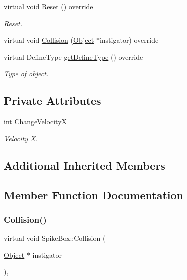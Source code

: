 \begin{DoxyCompactItemize}
virtual void \hyperlink{class_spike_box_a367ab98224d87535dcd037ee46de2231}{Reset} () override
\begin{DoxyCompactList}\small\item\em Reset. \end{DoxyCompactList}\item 
virtual void \hyperlink{class_spike_box_a538790d5fe1e7619d693659f1e14cc44}{Collision} (\hyperlink{class_object}{Object} $\ast$instigator) override
\item 
\mbox{\label{class_spike_box_a55e11ae1fdb92e34e384dc4ee00cd805}} 
virtual Define\+Type \hyperlink{class_spike_box_a55e11ae1fdb92e34e384dc4ee00cd805}{get\+Define\+Type} () override
\begin{DoxyCompactList}\small\item\em Type of object. \end{DoxyCompactList}\end{DoxyCompactItemize}
\subsection*{Private Attributes}
\begin{DoxyCompactItemize}
\item 
\mbox{\label{class_spike_box_af38562c097cdb89864ceced7647dad89}} 
int \hyperlink{class_spike_box_af38562c097cdb89864ceced7647dad89}{Change\+VelocityX}
\begin{DoxyCompactList}\small\item\em Velocity X. \end{DoxyCompactList}\end{DoxyCompactItemize}
\subsection*{Additional Inherited Members}


\subsection{Member Function Documentation}
\mbox{\label{class_spike_box_a538790d5fe1e7619d693659f1e14cc44}} 
\subsubsection{\texorpdfstring{Collision()}{Collision()}}
{\footnotesize\ttfamily virtual void Spike\+Box\+::\+Collision (\begin{DoxyParamCaption}\item[{\hyperlink{class_object}{Object} $\ast$}]{instigator }\end{DoxyParamCaption})\hspace{0.3cm}{\ttfamily [override]}, {\ttfamily [virtual]}}

